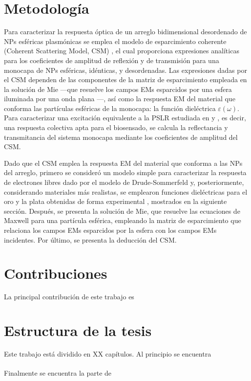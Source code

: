 \section*{Metodología}



Para  caracterizar la respuesta óptica de un arreglo bidimensional desordenado de NPs esféricas plasmónicas se emplea el modelo de esparcimiento coherente (Coherent Scattering Model, CSM) \cite{reyes2018analytical}, el cual proporciona expresiones analíticas para los coeficientes de amplitud de reflexión y de transmisión para una monocapa de NPs esféricas, idénticas, y desordenadas.  Las expresiones  dadas por el CSM dependen de las componentes de la matriz de esparcimiento empleada en la solución de Mie ---que resuelve los campos EMs esparcidos por una esfera iluminada por una onda plana \cite{bohren1998absorption}---, así como la respuesta EM del material que conforma las partículas esféricas de la monocapa: la función dieléctrica $\varepsilon(\omega)$.  Para caracterizar una excitación equivalente a la PSLR estudiada en \cite{kabashin2009plasmonic} y \cite{danilov2018ultra}, es decir, una respuesta colectiva apta para el biosensado, se calcula la reflectancia y transmitancia del sistema monocapa mediante los coeficientes de amplitud del CSM. 
 
Dado que el CSM emplea la respuesta EM del material que conforma a las NPs del arreglo, primero se consideró un modelo simple para caracterizar la respuesta de electrones libres dado por el modelo de Drude-Sommerfeld \cite{novotny2006principles} y, posteriormente, considerando materiales más  realistas, se emplearon funciones dieléctricas para el oro y la plata obtenidas de forma experimental \cite{johnson1972constants}, mostrados en la siguiente sección.  Después, se presenta la solución de Mie, que resuelve las ecuaciones de Maxwell para una partícula esférica, empleando la matriz de esparcimiento que relaciona los campos EMs esparcidos por la esfera con los campos EMs incidentes.  Por último, se presenta la deducción del CSM. 

\section*{Contribuciones}

La principal contribución de este trabajo es 
\blindtext

\section*{Estructura de la tesis}

Este trabajo está dividido en XX capítulos. Al principio se encuentra 
\\\\
Finalmente se encuentra la parte de 